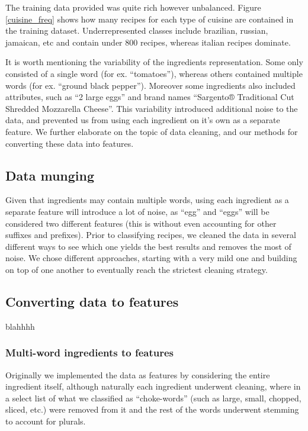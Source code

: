 \documentclass[prodmode,acmtap]{acmlarge}
\begin{document}
The training data provided was quite rich however unbalanced. Figure \ref{cuisine_freq} shows how many recipes for each type of cuisine are contained in the training dataset. Underrepresented classes include brazilian, russian, jamaican, etc and contain under 800 recipes, whereas italian recipes dominate.

It is worth mentioning the variability of the ingredients representation. Some only consisted of a single word (for ex. ``tomatoes''), whereas others contained multiple words (for ex. ``ground black pepper''). Moreover some ingredients also included attributes, such as ``2 large eggs'' and brand names ``Sargento® Traditional Cut Shredded Mozzarella Cheese''. This variability introduced additional noise to the data, and prevented us from using each ingredient on it’s own as a separate feature. We further elaborate on the topic of data cleaning, and our methods for converting these data into features.

\subsection{Data munging}
Given that ingredients may contain multiple words, using each ingredient as a separate feature will introduce a lot of noise, as “egg” and “eggs” will be considered two different features (this is without even accounting for other suffixes and prefixes). Prior to classifying recipes, we cleaned the data in several different ways to see which one yields the best results and removes the most of noise. We chose different approaches, starting with a very mild one and building on top of one another to eventually reach the strictest cleaning strategy. 

\subsection{Converting data to features}
blahhhh
\subsubsection{Multi-word ingredients to features}
Originally we implemented the data as features by considering the entire ingredient itself, although naturally each ingredient underwent cleaning, where in a select list of what we classified as ``choke-words'' (such as large, small, chopped, sliced, etc.) were removed from it and the rest of the words underwent stemming to account for plurals.
\end{document}
